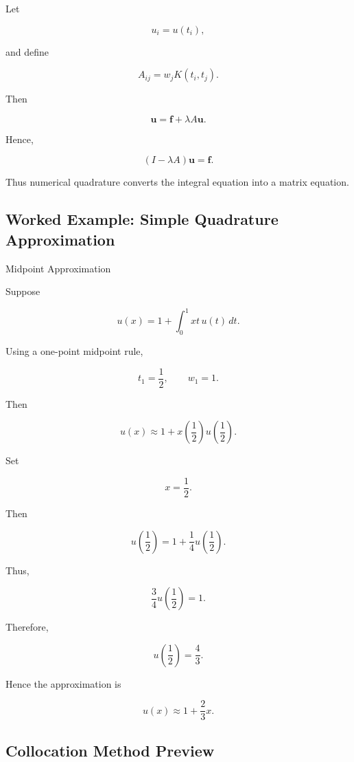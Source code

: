 Let

\[
u_i=u(t_i),
\]

and define

\[
A_{ij}
=
w_jK(t_i,t_j).
\]

Then

\[
\boxed{
\mathbf{u}
=
\mathbf{f}
+
\lambda A\mathbf{u}.
}
\]

Hence,

\[
\boxed{
(I-\lambda A)\mathbf{u}
=
\mathbf{f}.
}
\]

Thus numerical quadrature converts the integral equation into a matrix
equation.

\subsection{Worked Example: Simple Quadrature Approximation}
\label{subsec:worked-integral-quadrature}

\begin{workedexamplebox}{Midpoint Approximation}

Suppose

\[
u(x)
=
1
+
\int_0^1
xt\,u(t)\,dt.
\]

Using a one-point midpoint rule,

\[
t_1=\frac12,
\qquad
w_1=1.
\]

Then

\[
u(x)
\approx
1
+
x
\left(
\frac12
\right)
u\left(\frac12\right).
\]

Set

\[
x=\frac12.
\]

Then

\[
u\left(\frac12\right)
=
1
+
\frac14
u\left(\frac12\right).
\]

Thus,

\[
\frac34
u\left(\frac12\right)
=
1.
\]

Therefore,

\[
u\left(\frac12\right)
=
\frac43.
\]

Hence the approximation is

\begin{answerbox}
\[
\boxed{
u(x)
\approx
1+\frac23x.
}
\]
\end{answerbox}

\end{workedexamplebox}

\subsection{Collocation Method Preview}
\label{subsec:collocation-integral-equations}

